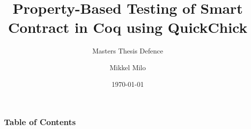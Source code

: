 \documentclass{beamer}
\title{Property-Based Testing of Smart Contract in Coq using QuickChick}
\subtitle{Masters Thesis Defence}
\author{Mikkel Milo}
\institute{Department of Computer Science\\Aarhus University}
\date{\today}
\begin{document}
\frame{\titlepage}

\begin{frame}
\frametitle{Table of Contents}
\tableofcontents
\end{frame}






\end{document}
